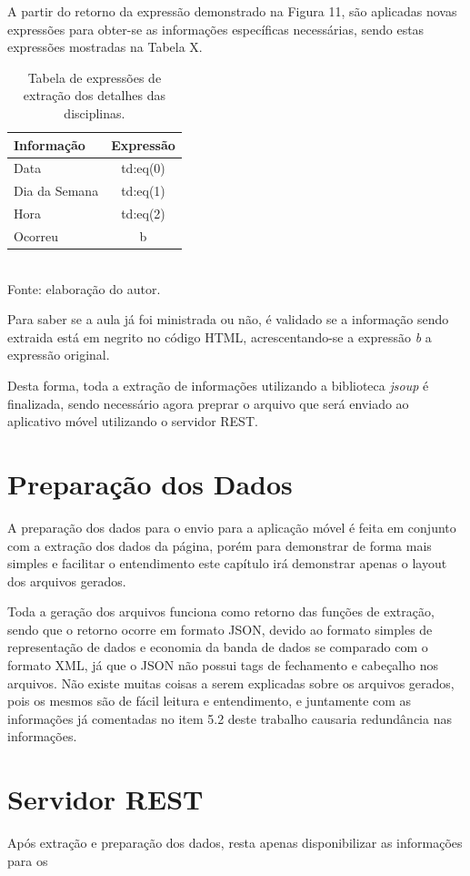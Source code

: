 \newpage

A partir do retorno da expressão demonstrado na Figura 11, são aplicadas novas expressões para obter-se as informações específicas necessárias, sendo estas expressões mostradas na Tabela X.

\begin{table}[!hbt]
\centering
\caption[Extração de Informações - Expressões de Extração dos Detalhes da Disciplina]{Tabela de expressões de extração dos detalhes das disciplinas.}
\vspace{3mm}
\begin{tabular}{p{3cm}|c}\hline
\bf{Informação} & \bf{Expressão}                                 \\ \hline
Data            & td:eq(0) \\ \hline
Dia da Semana   & td:eq(1) \\ \hline
Hora            & td:eq(2) \\ \hline
Ocorreu         & b        \\ \hline
\end{tabular}
\\ Fonte: elaboração do autor.
\end{table}

Para saber se a aula já foi ministrada ou não, é validado se a informação sendo extraida está em negrito no código HTML, acrescentando-se a expressão \emph{b} a expressão original.

Desta forma, toda a extração de informações utilizando a biblioteca \emph{jsoup} é finalizada, sendo necessário agora preprar o arquivo que será enviado ao aplicativo móvel utilizando o servidor REST.

\section{Preparação dos Dados}
A preparação dos dados para o envio para a aplicação móvel é feita em conjunto com a extração dos dados da página, porém para demonstrar de forma mais simples e facilitar o entendimento este capítulo irá demonstrar apenas o layout dos arquivos gerados. 

Toda a geração dos arquivos funciona como retorno das funções de extração, sendo que o retorno ocorre em formato JSON, devido ao formato simples de representação de dados e economia da banda de dados se comparado com o formato XML, já que o JSON não possui tags de fechamento e cabeçalho nos arquivos. Não existe muitas coisas a serem explicadas sobre os arquivos gerados, pois os mesmos são de fácil leitura e entendimento, e juntamente com as informações já comentadas no item 5.2 deste trabalho causaria redundância nas informações.

\section{Servidor REST}
Após extração e preparação dos dados, resta apenas disponibilizar as informações para os